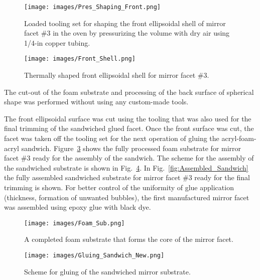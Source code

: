 \begin{figure}[ht]
    \centering
    \texttt{[image: images/Pres\_Shaping\_Front.png]}
    \caption{Loaded tooling set for shaping the front ellipsoidal shell of mirror facet \#3 in the oven by
      pressurizing the volume with dry air using 1/4-in copper tubing.}
    \label{fig:Pres_Shaping_Front}
\end{figure}

\begin{figure}[ht]
    \centering
    \texttt{[image: images/Front\_Shell.png]}
    \caption{Thermally shaped front ellipsoidal shell for mirror facet \#3.}
    \label{fig:Shell}
\end{figure}

The cut-out of the foam substrate and processing of the back surface of spherical shape was performed without
using any custom-made tools.%

The front ellipsoidal surface was cut using the tooling that was also used for the final trimming of the sandwiched
glued facet. Once the front surface was cut, the facet was taken off the tooling set for the next operation of
gluing the acryl-foam-acryl sandwich. Figure~\ref{fig:Foam_Sub} shows the fully processed foam substrate for
mirror facet \#3 ready for the assembly of the sandwich. The scheme for the assembly of the sandwiched
substrate is shown in Fig.~\ref{fig:Gluing_Sandwich}. In Fig.~\ref{fig:Assembled_Sandwich} the fully assembled
sandwiched substrate for mirror facet \#3 ready for the final trimming is shown. For better control of the uniformity of glue application (thickness, formation of unwanted bubbles), the first manufactured
mirror facet was assembled using epoxy glue with black dye.

\begin{figure}[ht]
    \centering
    \texttt{[image: images/Foam\_Sub.png]}
    \caption{A completed foam substrate that forms the core of the mirror facet.}
    \label{fig:Foam_Sub}
\end{figure}

\begin{figure}[ht]
    \centering
    \texttt{[image: images/Gluing\_Sandwich\_New.png]}
    \caption{Scheme for gluing of the sandwiched mirror substrate.}
    \label{fig:Gluing_Sandwich}
\end{figure}
 
